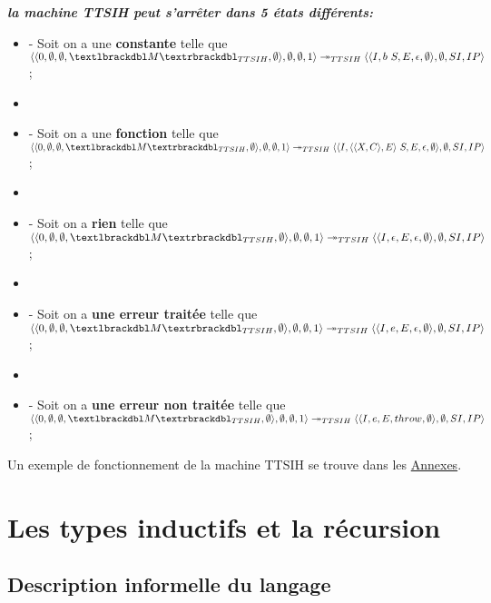 \documentclass[10pt,a4paper]{report}
\begin{document}
	
	\textbf{\textit{la machine TTSIH peut s'arrêter dans 5 états différents:}}
	\smallbreak
	\begin{itemize}
		\item[] - Soit on a une \textbf{constante} telle que 
		$\langle\langle 0,\emptyset,\emptyset,\textlbrackdbl M\textrbrackdbl_{TTSIH},\emptyset\rangle,\emptyset,\emptyset,1\rangle 
		\twoheadrightarrow_{TTSIH} 
		\langle\langle I,b~S,E,\epsilon,\emptyset\rangle,\emptyset,SI,IP\rangle$;
		\item[] 
		\item[] - Soit on a une \textbf{fonction} telle que
		$\langle\langle 0,\emptyset,\emptyset,\textlbrackdbl M\textrbrackdbl_{TTSIH},\emptyset\rangle,\emptyset,\emptyset,1\rangle 
		\twoheadrightarrow_{TTSIH} 
		\langle\langle I,\langle\langle X,C\rangle,E\rangle~S,E,\epsilon,\emptyset\rangle,\emptyset,SI,IP\rangle$;
		\item[] 
		\item[] - Soit on a \textbf{rien} telle que  
		$\langle\langle 0,\emptyset,\emptyset,\textlbrackdbl M\textrbrackdbl_{TTSIH},\emptyset\rangle,\emptyset,\emptyset,1\rangle 
		\twoheadrightarrow_{TTSIH} 
		\langle\langle I,\epsilon,E,\epsilon,\emptyset\rangle,\emptyset,SI,IP\rangle$;
		\item[]
		\item[] - Soit on a \textbf{une erreur traitée} telle que  
		$\langle\langle 0,\emptyset,\emptyset,\textlbrackdbl M\textrbrackdbl_{TTSIH},\emptyset\rangle,\emptyset,\emptyset,1\rangle 
		\twoheadrightarrow_{TTSIH} 
		\langle\langle I,e,E,\epsilon,\emptyset\rangle,\emptyset,SI,IP\rangle$;
		\item[]
		\item[] - Soit on a \textbf{une erreur non traitée} telle que  
		$\langle\langle 0,\emptyset,\emptyset,\textlbrackdbl M\textrbrackdbl_{TTSIH},\emptyset\rangle,\emptyset,\emptyset,1\rangle 
		\twoheadrightarrow_{TTSIH} 
		\langle\langle I,e,E,throw,\emptyset\rangle,\emptyset,SI,IP\rangle$;
	\end{itemize}
	\bigbreak
	
	
	Un exemple de fonctionnement de la machine TTSIH se trouve dans les \hyperref[TTSI]{Annexes}.
	\newpage
	
	\section{Les types inductifs et la récursion}
	
	\subsection{Description informelle du langage}
	
\end{document}
